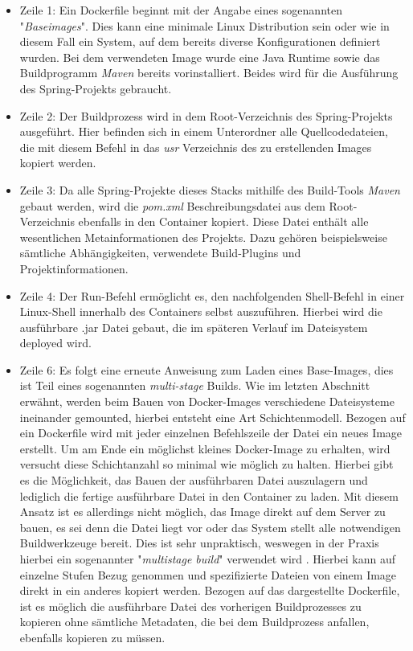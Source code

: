 \begin{itemize}

  \item Zeile 1: Ein Dockerfile beginnt mit der Angabe eines sogenannten "\emph{Baseimages}". Dies kann eine minimale Linux Distribution sein oder wie in diesem Fall ein System, auf dem bereits diverse Konfigurationen definiert wurden. Bei dem verwendeten Image wurde eine Java Runtime sowie das Buildprogramm \emph{Maven} bereits vorinstalliert. Beides wird für die Ausführung des Spring-Projekts gebraucht. 

  \item Zeile 2: Der Buildprozess wird in dem Root-Verzeichnis des Spring-Projekts ausgeführt. Hier befinden sich in einem Unterordner alle Quellcodedateien, die mit diesem Befehl in das \emph{usr} Verzeichnis des zu erstellenden Images kopiert werden. 
  
  \item Zeile 3: Da alle Spring-Projekte dieses Stacks mithilfe des Build-Tools \emph{Maven} gebaut werden, wird die \emph{pom.xml} Beschreibungsdatei aus dem Root-Verzeichnis ebenfalls in den Container kopiert. Diese Datei enthält alle wesentlichen Metainformationen des Projekts. Dazu gehören beispielsweise sämtliche Abhängigkeiten, verwendete Build-Plugins und Projektinformationen. 

  \item Zeile 4: Der Run-Befehl ermöglicht es, den nachfolgenden Shell-Befehl in einer Linux-Shell innerhalb des Containers selbst auszuführen. Hierbei wird die ausführbare .jar Datei gebaut, die im späteren Verlauf im Dateisystem deployed wird.

  \item Zeile 6: Es folgt eine erneute Anweisung zum Laden eines Base-Images, dies ist Teil eines sogenannten \emph{multi-stage} Builds. Wie im letzten Abschnitt erwähnt, werden beim Bauen von Docker-Images verschiedene Dateisysteme ineinander gemounted, hierbei entsteht eine Art Schichtenmodell. Bezogen auf ein Dockerfile wird mit jeder einzelnen Befehlszeile der Datei ein neues Image erstellt. Um  am Ende ein möglichst kleines Docker-Image zu erhalten, wird versucht diese Schichtanzahl so minimal wie möglich zu halten. Hierbei gibt es die Möglichkeit, das Bauen der ausführbaren Datei auszulagern und lediglich die fertige ausführbare Datei in den Container zu laden. Mit diesem Ansatz ist es allerdings nicht möglich, das Image direkt auf dem Server zu bauen, es sei denn die Datei liegt vor oder das System stellt alle notwendigen Buildwerkzeuge bereit. Dies ist sehr unpraktisch, weswegen in der Praxis hierbei ein sogenannter "\emph{multistage build}" verwendet wird \label{it:multiBuild} \cite[Kapitel~multi stage build]{docker-doc}. Hierbei kann auf einzelne Stufen Bezug genommen und spezifizierte Dateien von einem Image direkt in ein anderes kopiert werden. Bezogen auf das dargestellte Dockerfile, ist es möglich die ausführbare Datei des vorherigen Buildprozesses zu kopieren ohne sämtliche Metadaten, die bei dem Buildprozess anfallen, ebenfalls kopieren zu müssen.


\end{itemize}
